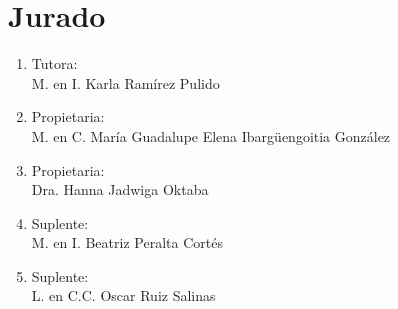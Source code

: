 \chapter*{Jurado}
\thispagestyle{empty}
\begin{enumerate}
	\item Tutora:\\
	M. en I. Karla Ramírez Pulido
	\item Propietaria:\\
	M. en C. María Guadalupe Elena Ibargüengoitia González
	\item Propietaria:\\
	Dra. Hanna Jadwiga Oktaba
	\item Suplente:\\
	M. en I. Beatriz Peralta Cortés
	\item Suplente:\\
	L. en C.C. Oscar Ruiz Salinas
\end{enumerate}
\clearpage
\thispagestyle{empty}
